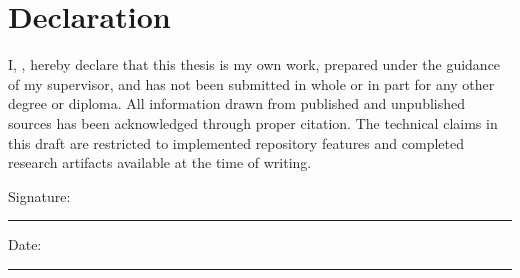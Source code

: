 \chapter*{Declaration}
\thispagestyle{empty}
I, \StudentName, hereby declare that this thesis is my own work, prepared under the guidance of my supervisor, and has not been submitted in whole or in part for any other degree or diploma. All information drawn from published and unpublished sources has been acknowledged through proper citation. The technical claims in this draft are restricted to implemented repository features and completed research artifacts available at the time of writing.

\vspace{1.5cm}
\noindent Signature: \rule{5cm}{0.4pt}\hfill Date: \rule{4cm}{0.4pt}
\clearpage
